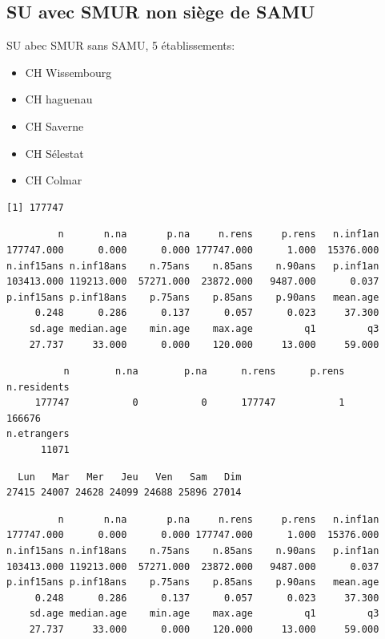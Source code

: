 \documentclass[]{article}
\begin{document}
\subsection{SU avec SMUR non siège de
SAMU}\label{su-avec-smur-non-siege-de-samu}

SU abec SMUR sans SAMU, 5 établissements:

\begin{itemize}
\itemsep1pt\parskip0pt
\item
  CH Wissembourg
\item
  CH haguenau
\item
  CH Saverne
\item
  CH Sélestat
\item
  CH Colmar
\end{itemize}

\begin{verbatim}
[1] 177747
\end{verbatim}

\begin{verbatim}
         n       n.na       p.na     n.rens     p.rens   n.inf1an 
177747.000      0.000      0.000 177747.000      1.000  15376.000 
n.inf15ans n.inf18ans    n.75ans    n.85ans    n.90ans   p.inf1an 
103413.000 119213.000  57271.000  23872.000   9487.000      0.037 
p.inf15ans p.inf18ans    p.75ans    p.85ans    p.90ans   mean.age 
     0.248      0.286      0.137      0.057      0.023     37.300 
    sd.age median.age    min.age    max.age         q1         q3 
    27.737     33.000      0.000    120.000     13.000     59.000 
\end{verbatim}

\begin{verbatim}
          n        n.na        p.na      n.rens      p.rens n.residents 
     177747           0           0      177747           1      166676 
n.etrangers 
      11071 
\end{verbatim}

\begin{verbatim}
  Lun   Mar   Mer   Jeu   Ven   Sam   Dim 
27415 24007 24628 24099 24688 25896 27014 
\end{verbatim}

\begin{verbatim}
         n       n.na       p.na     n.rens     p.rens   n.inf1an 
177747.000      0.000      0.000 177747.000      1.000  15376.000 
n.inf15ans n.inf18ans    n.75ans    n.85ans    n.90ans   p.inf1an 
103413.000 119213.000  57271.000  23872.000   9487.000      0.037 
p.inf15ans p.inf18ans    p.75ans    p.85ans    p.90ans   mean.age 
     0.248      0.286      0.137      0.057      0.023     37.300 
    sd.age median.age    min.age    max.age         q1         q3 
    27.737     33.000      0.000    120.000     13.000     59.000 
\end{verbatim}
\end{document}
